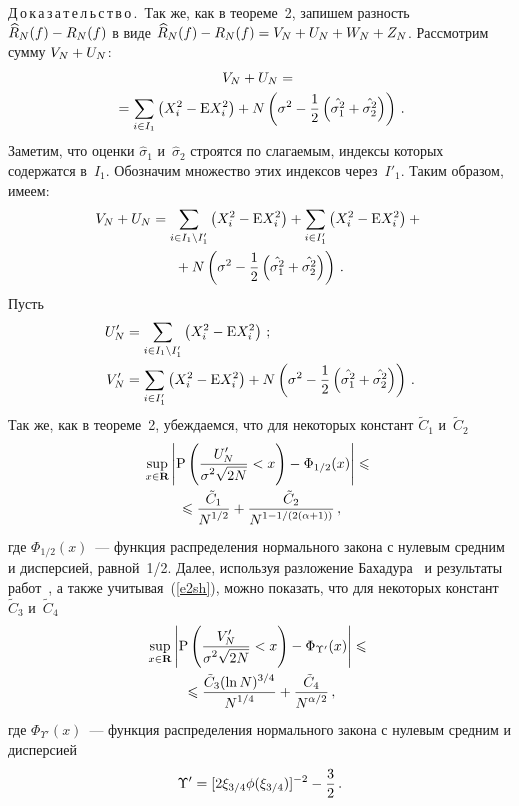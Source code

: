\begin{multicols}{2}
\noindent
Д\,о\,к\,а\,з\,а\,т\,е\,л\,ь\,с\,т\,в\,о\,.\ 
Так же, как в теореме~2, запишем разность $\widehat{R}_N(f)\hm-R_N(f)$ в виде
$\widehat{R}_N(f)\hm-R_N(f)\hm=V_N\hm+U_N\hm+W_N\hm+Z_N$. Рассмотрим сумму $V_N\hm+U_N$:
\begin{multline*}
V_N+U_N={}\\
{}=\sum\limits_{i\in I_1}\left(X_i^2-\mbox{E}X_i^2\right)+
N\left(\sigma^2-\displaystyle\frac{\displaystyle 1\mathstrut}{\displaystyle 2\mathstrut}\left(\hat{\sigma_1^2}+\hat{\sigma_2^2}\right)\right)\,.
\end{multline*}
Заметим, что оценки $\hat{\sigma}_1$ и~$\hat{\sigma}_2$ строятся по сла\-га\-емым, 
индексы которых содержатся в~$I_1$. Обозначим множество этих индексов через~$I'_1$. 
Таким образом, имеем:
\begin{multline*}
V_N+U_N=\sum\limits_{i\in I_1\setminus I'_1}\left(
X_i^2-\mbox{E}X_i^2\right)+\sum\limits_{i\in I'_1}\left(
X_i^2-\mbox{E}X_i^2\right)+{}\\
{}+N\left(\sigma^2-\displaystyle\frac{\displaystyle 1\mathstrut}{\displaystyle 2\mathstrut}\left(
\hat{\sigma_1^2}+\hat{\sigma_2^2}\right)\right)\,.
\end{multline*}
Пусть
\begin{align*}
U'_N&=\sum\limits_{i\in I_1\setminus I'_1}\left(X_i^2-\mbox{E}X_i^2\right)\,;
\\
V'_N&=\sum\limits_{i\in I'_1}\left(X_i^2-\mbox{E}X_i^2\right)+
N\left(\sigma^2-\displaystyle\frac{\displaystyle 1\mathstrut}{\displaystyle 2\mathstrut}\left(\hat{\sigma_1^2}+\hat{\sigma_2^2}\right)\right)\,.
\end{align*}
Так же, как в теореме~2, убеждаемся, что для некоторых констант  $\tilde{C}_1$ и~$\tilde{C}_2$
\begin{multline}
\sup\limits_{x\in\mathbf{R}}\left\vert\mbox{P}\left(
\displaystyle\frac{\displaystyle U'_N\mathstrut}{\displaystyle \sigma^2\sqrt{2N}\mathstrut}<x\right)-\Phi_{1/2}(x)\right\vert\leqslant{}\\
{}\leqslant
\displaystyle\frac{\displaystyle \tilde{C}_1\mathstrut}{\displaystyle N^{{1}/{2}}\mathstrut}+\displaystyle\frac{\displaystyle \tilde{C}_2\mathstrut}{\displaystyle N^{1-{1}/(2(\alpha+1))}\mathstrut}\,,\label{e28sh}
\end{multline}
где $\Phi_{1/2}(x)$~--- функция распределения нормального закона с нулевым 
средним и дисперсией, равной~1/2.
Далее, используя разложение Бахадура~\cite{14sh} и результаты 
работ~\cite{7sh, 12sh, 17sh, 16sh, 20sh}, 
а также учитывая~(\ref{e2sh}), можно показать, что для некоторых констант~$\tilde{C}_3$ 
и~$\tilde{C}_4$
\begin{multline}
\sup\limits_{x\in\mathbf{R}}\left\vert\mbox{P}\left(
\displaystyle\frac{\displaystyle V'_N\mathstrut}{\displaystyle \sigma^2\sqrt{2N}\mathstrut}<x\right)-\Phi_{\Upsilon'}(x)\right\vert\leqslant{}\\
{}\leqslant
\displaystyle\frac{\displaystyle \tilde{C}_3(\ln N)^{{3}/{4}}\mathstrut}{\displaystyle N^{{1}/{4}}\mathstrut}+
\displaystyle\frac{\displaystyle \tilde{C}_4\mathstrut}{\displaystyle N^{{\alpha}/{2}}\mathstrut}\,,\label{e29sh}
\end{multline}
где $\Phi_{\Upsilon'}(x)$~--- функция распределения нормального закона с нулевым 
средним и дисперсией 
$$
\Upsilon'\hm=[2\xi_{3/4}\phi(\xi_{3/4})]^{-2}\hm-\fr{3}{2}\,.
$$


\end{multicols}
